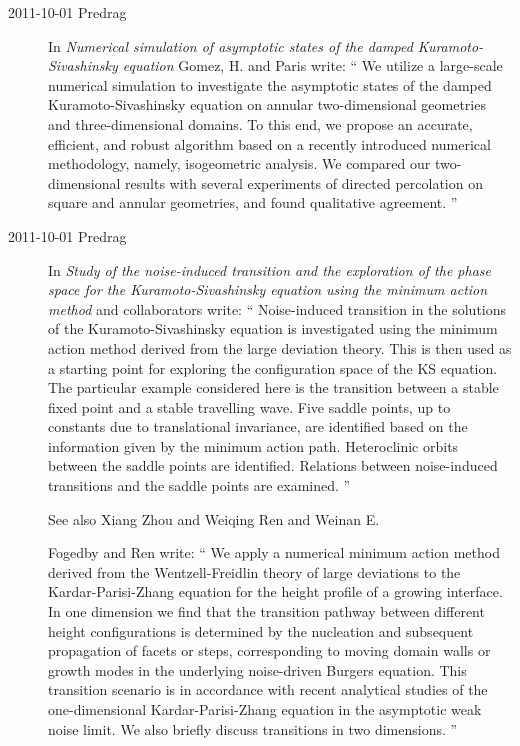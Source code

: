 \begin{description}
\item[2011-10-01 Predrag]
In {\em Numerical simulation of asymptotic states of the damped
            {Kuramoto-Sivashinsky} equation}
Gomez, H. and Paris write: ``
We utilize a large-scale numerical simulation to investigate the
asymptotic states of the damped Kuramoto-Sivashinsky equation on annular
two-dimensional geometries and three-dimensional domains. To this end, we
propose an accurate, efficient, and robust algorithm based on a recently
introduced numerical methodology, namely, isogeometric analysis. We
compared our two-dimensional results with several experiments of directed
percolation on square and annular geometries, and found qualitative
agreement.
''

\item[2011-10-01 Predrag]
In {\em Study of the noise-induced transition and the exploration of the
  phase space for the {Kuramoto-Sivashinsky} equation using the minimum
  action method}
 and
collaborators write: ``
Noise-induced transition in the solutions of the
  Kuramoto-Sivashinsky equation is investigated using the
  minimum action method derived from the large deviation theory. This is
  then used as a starting point for exploring the configuration space of
  the KS equation. The particular example considered here is the
  transition between a stable fixed point and a stable travelling wave.
  Five saddle points, up to constants due to translational invariance,
  are identified based on the information given by the minimum action
  path. Heteroclinic orbits between the saddle points are identified.
  Relations between noise-induced transitions and the saddle points are
  examined.
''

See also Xiang Zhou and  Weiqing Ren and Weinan E.

Fogedby and Ren write: ``
We apply a numerical minimum action method derived from the
Wentzell-Freidlin theory of large deviations to the Kardar-Parisi-Zhang
equation for the height profile of a growing interface. In one dimension
we find that the transition pathway between different height
configurations is determined by the nucleation and subsequent propagation
of facets or steps, corresponding to moving domain walls or growth modes
in the underlying noise-driven Burgers equation. This transition scenario
is in accordance with recent analytical studies of the one-dimensional
Kardar-Parisi-Zhang equation in the asymptotic weak noise limit. We also
briefly discuss transitions in two dimensions.
''


\end{description}
